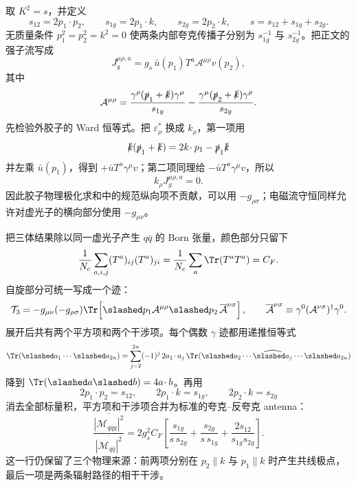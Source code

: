\begin{derivation}
取 $K^2=s$，并定义
\begin{equation*}
s_{12}=2p_1\!\cdot p_2,\qquad
s_{1g}=2p_1\!\cdot k,\qquad
s_{2g}=2p_2\!\cdot k,\qquad
s=s_{12}+s_{1g}+s_{2g}.
\end{equation*}
无质量条件 $p_1^2=p_2^2=k^2=0$ 使两条内部夸克传播子分别为 $s_{1g}^{-1}$ 与 $s_{2g}^{-1}$。把正文的强子流写成
\begin{equation*}
J_g^{\mu\rho,a}
=g_s\,\bar u(p_1)T^a\mathcal A^{\mu\rho}v(p_2),
\end{equation*}
其中
\begin{equation*}
\mathcal A^{\mu\rho}
=\frac{\gamma^\rho(\slashed p_1+\slashed k)\gamma^\mu}{s_{1g}}
-\frac{\gamma^\mu(\slashed p_2+\slashed k)\gamma^\rho}{s_{2g}}.
\end{equation*}
先检验外胶子的 Ward 恒等式。把 $\varepsilon_\rho^*$ 换成 $k_\rho$，第一项用
\begin{equation*}
\slashed k(\slashed p_1+\slashed k)
=2k\!\cdot p_1-\slashed p_1\slashed k
\end{equation*}
并左乘 $\bar u(p_1)$，得到 $+\bar uT^a\gamma^\mu v$；第二项同理给 $-\bar uT^a\gamma^\mu v$，所以
\begin{equation*}
k_\rho J_g^{\mu\rho,a}=0.
\end{equation*}
因此胶子物理极化求和中的规范纵向项不贡献，可以用 $-g_{\rho\sigma}$；电磁流守恒同样允许对虚光子的横向部分使用 $-g_{\mu\nu}$。

把三体结果除以同一虚光子产生 $q\bar q$ 的 Born 张量，颜色部分只留下
\begin{equation*}
\frac1{N_c}\sum_{a,i,j}(T^a)_{ij}(T^a)_{ji}
=\frac1{N_c}\sum_a\Tr(T^aT^a)=C_F.
\end{equation*}
自旋部分可统一写成一个迹：
\begin{equation*}
\mathcal T_3
=-g_{\mu\nu}(-g_{\rho\sigma})
\Tr\!\left[
\slashed p_1\mathcal A^{\mu\rho}
\slashed p_2\,\overline{\mathcal A}^{\nu\sigma}
\right],
\qquad
\overline{\mathcal A}^{\nu\sigma}
\equiv\gamma^0(\mathcal A^{\nu\sigma})^\dagger\gamma^0.
\end{equation*}
展开后共有两个平方项和两个干涉项。每个偶数 $\gamma$ 迹都用递推恒等式
\begin{equation*}
\Tr(\slashed a_1\cdots\slashed a_{2n})
=\sum_{j=2}^{2n}(-1)^j\,2a_1\!\cdot a_j\,
\Tr(\slashed a_2\cdots\widehat{\slashed a_j}\cdots\slashed a_{2n})
\end{equation*}
降到 $\Tr(\slashed a\slashed b)=4a\!\cdot b$。再用
\begin{equation*}
2p_1\!\cdot p_2=s_{12},\qquad
2p_1\!\cdot k=s_{1g},\qquad
2p_2\!\cdot k=s_{2g}
\end{equation*}
消去全部标量积，平方项和干涉项合并为标准的夸克--反夸克 antenna：
\begin{equation*}
\frac{\overline{|\mathcal M_{q\bar qg}|^2}}
{\overline{|\mathcal M_{q\bar q}|^2}}
=2g_s^2C_F
\left[
\frac{s_{1g}}{s\,s_{2g}}
+\frac{s_{2g}}{s\,s_{1g}}
+\frac{2s_{12}}{s_{1g}s_{2g}}
\right].
\end{equation*}
这一行仍保留了三个物理来源：前两项分别在 $p_2\parallel k$ 与 $p_1\parallel k$ 时产生共线极点，最后一项是两条辐射路径的相干干涉。


\end{derivation}
